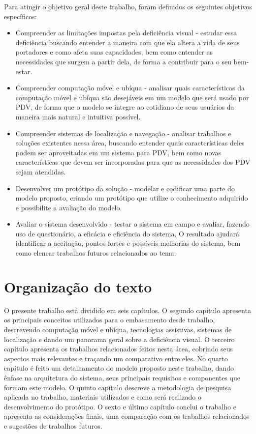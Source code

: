 \documentclass[english,brazilian]{UNISINOSmonografia}
\begin{document}
		Para atingir o objetivo geral deste trabalho, foram definidos os seguintes objetivos específicos:

		\begin{itemize}
			\item Compreender as limitações impostas pela deficiência visual - estudar essa deficiência buscando entender a maneira com que ela altera a vida de seus portadores e como afeta suas capacidades, bem como entender as necessidades que surgem a partir dela, de forma a contribuir para o seu bem-estar.

			\item Compreender computação móvel e ubíqua - analisar quais características da computação móvel e ubíqua são desejáveis em um modelo que será usado por PDV, de forma que o modelo se integre ao cotidiano de seus usuários da maneira mais natural e intuitiva possível.

			\item Compreender sistemas de localização e navegação - analisar trabalhos e soluções existentes nessa área, buscando entender quais características deles podem ser aproveitadas em um sistema para PDV, bem como novas características que devem ser incorporadas para que as necessidades dos PDV sejam atendidas.

			\item Desenvolver um protótipo da solução - modelar e codificar uma parte do modelo proposto, criando um protótipo que utilize o conhecimento adquirido e possibilite a avaliação do modelo.

			\item Avaliar o sistema desenvolvido - testar o sistema em campo e avaliar, fazendo uso de questionário, a eficácia e eficiência do sistema. O resultado ajudará identificar a aceitação, pontos fortes e possíveis melhorias do sistema, bem como elencar trabalhos futuros relacionados ao tema. %
		\end{itemize}

	\section{Organização do texto}
O presente trabalho está dividido em seis capítulos. 
O segundo capítulo apresenta os principais conceitos utilizados para o embasamento desde trabalho, descrevendo computação móvel e ubíqua, tecnologias assistivas, sistemas de localização e dando um panorama geral sobre a deficiência visual.
O terceiro capítulo apresenta os trabalhos relacionados feitos nesta área, cobrindo seus aspectos mais relevantes e traçando um comparativo entre eles.
No quarto capítulo é feito um detalhamento do modelo proposto neste trabalho, dando ênfase na arquitetura do sistema, seus principais requisitos e componentes que formam este modelo.
O quinto capítulo descreve a metodologia de pesquisa aplicada no trabalho, materiais utilizados e como será realizado o desenvolvimento do protótipo.
O sexto e último capítulo conclui o trabalho e apresenta as considerações finais, uma comparação com os trabalhos relacionados e sugestões de trabalhos futuros.
\end{document}

